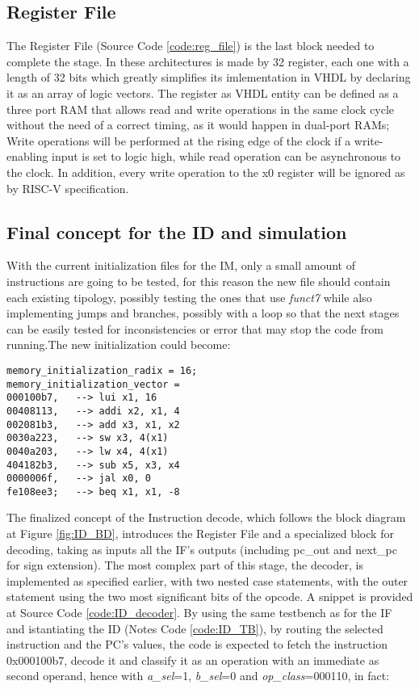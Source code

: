 \subsection{Register File}
The Register File (Source Code \ref{code:reg_file}) is the last block needed to complete the stage. In these architectures is made by 32 register, each one with a length of 32 bits which greatly simplifies its imlementation in VHDL by declaring it as an array of logic vectors.
The register as VHDL entity can be defined as a three port RAM that allows read and write operations in the same clock cycle without the need of a correct timing, as it would happen in dual-port RAMs; Write operations will be performed at the rising edge of the clock if a write-enabling input is set to logic high, while read operation can be asynchronous to the clock. In addition, every write operation to the x0 register will be ignored as by RISC-V specification.

\subsection{Final concept for the ID and simulation}
With the current initialization files for the IM, only a small amount of instructions are going to be tested, for this reason the new file should contain each existing tipology, possibly testing the ones that use \emph{funct7} while also implementing jumps and branches, possibly with a loop so that the next stages can be easily tested for inconsistencies or error that may stop the code from running.The new initialization could become:

\begin{verbatim}
memory_initialization_radix = 16;
memory_initialization_vector =
000100b7,   --> lui x1, 16
00408113,   --> addi x2, x1, 4
002081b3,   --> add x3, x1, x2
0030a223,   --> sw x3, 4(x1)
0040a203,   --> lw x4, 4(x1)
404182b3,   --> sub x5, x3, x4
0000006f,   --> jal x0, 0 
fe108ee3;   --> beq x1, x1, -8
\end{verbatim}

The finalized concept of the Instruction decode, which follows the block diagram at Figure \ref{fig:ID_BD}, introduces the Register File and a specialized block for decoding, taking as inputs all the IF's outputs (including {pc\_out} and {next\_pc} for sign extension).
The most complex part of this stage, the decoder, is implemented as specified earlier, with two nested case statements, with the outer statement using the two most significant bits of the opcode. A snippet is provided at Source Code \ref{code:ID_decoder}.
By using the same testbench as for the IF and istantiating the ID (Notes Code \ref{code:ID_TB}), by routing the selected instruction and the PC's values, the code is expected to fetch the instruction 0x000100b7, decode it and classify it as an operation with an immediate as second operand, hence with \emph{a{\_}sel}=1, \emph{b{\_}sel}=0 and \emph{op{\_}class}=000110, in fact:


